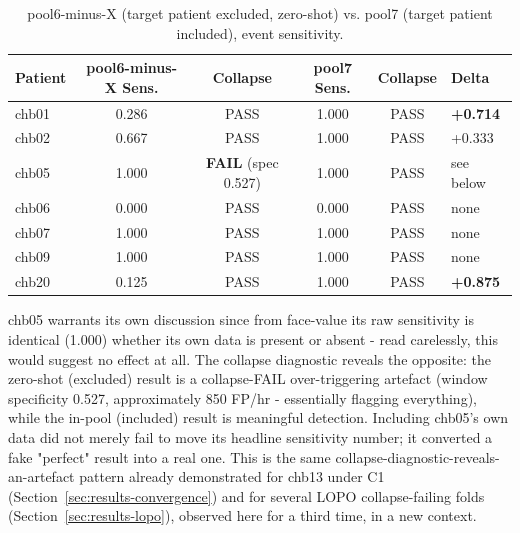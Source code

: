 \begin{table}[H]
\centering
\caption{pool6-minus-X (target patient excluded, zero-shot) vs. pool7 (target patient included), event sensitivity.}
\label{tab:pool6-minus-x}
\begin{tabular}{lccccl}
\toprule
Patient & pool6-minus-X Sens. & Collapse & pool7 Sens. & Collapse & Delta \\
\midrule
chb01 & 0.286 & PASS & 1.000 & PASS & \textbf{+0.714} \\
chb02 & 0.667 & PASS & 1.000 & PASS & +0.333 \\
chb05 & 1.000 & \textbf{FAIL} (spec 0.527) & 1.000 & PASS & see below \\
chb06 & 0.000 & PASS & 0.000 & PASS & none \\
chb07 & 1.000 & PASS & 1.000 & PASS & none \\
chb09 & 1.000 & PASS & 1.000 & PASS & none \\
chb20 & 0.125 & PASS & 1.000 & PASS & \textbf{+0.875} \\
\bottomrule
\end{tabular}
\end{table}

chb05 warrants its own discussion since from face-value its raw sensitivity is identical (1.000) whether its own data is present or absent - read carelessly, this would suggest no effect at all. The collapse diagnostic reveals the opposite: the zero-shot (excluded) result is a collapse-FAIL over-triggering artefact (window specificity 0.527, approximately 850 FP/hr - essentially flagging everything), while the in-pool (included) result is meaningful detection. Including chb05's own data did not merely fail to move its headline sensitivity number; it converted a fake "perfect" result into a real one. This is the same collapse-diagnostic-reveals-an-artefact pattern already demonstrated for chb13 under C1 (Section~\ref{sec:results-convergence}) and for several LOPO collapse-failing folds (Section~\ref{sec:results-lopo}), observed here for a third time, in a new context.


